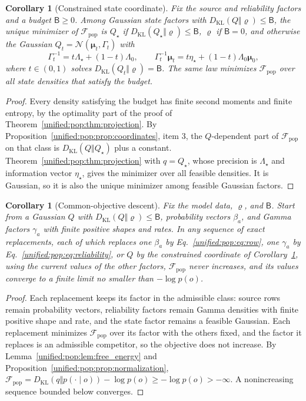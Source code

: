 \documentclass[11pt]{article}
\newtheorem{corollary}[theorem]{Corollary}
\theoremstyle{definition}
\theoremstyle{remark}
\providecommand{\KL}{D_{\mathrm{KL}}}
\providecommand{\N}{\mathcal{N}}
\providecommand{\F}{\mathcal{F}}
\begin{document}
\begin{corollary}[Constrained state coordinate]
\label{unified:pop:cor:constrained}
Fix the source and reliability factors and a budget $\mathsf B\ge0$. Among Gaussian state factors with $\KL(Q\Vert\varrho)\le\mathsf B$, the unique minimizer of $\F_{\mathrm{pop}}$ is $Q_\star$ if $\KL(Q_\star\Vert\varrho)\le\mathsf B$, $\varrho$ if $\mathsf B=0$, and otherwise the Gaussian $Q_t=\N(\boldsymbol\mu_t,\Gamma_t)$ with
\begin{equation}
\Gamma_t^{-1}=t\Lambda_\star+(1-t)\Lambda_0,\qquad \Gamma_t^{-1}\boldsymbol\mu_t=t\eta_\star+(1-t)\Lambda_0\boldsymbol\mu_0,
\label{unified:pop:eq:constrained}
\end{equation}
where $t\in(0,1)$ solves $\KL(Q_t\Vert\varrho)=\mathsf B$. The same law minimizes $\F_{\mathrm{pop}}$ over all state densities that satisfy the budget.
\end{corollary}

\begin{proof}
Every density satisfying the budget has finite second moments and finite entropy, by the optimality part of the proof of Theorem~\ref{unified:pop:thm:projection}. By Proposition~\ref{unified:pop:prop:coordinates}, item 3, the $Q$-dependent part of $\F_{\mathrm{pop}}$ on that class is $\KL(Q\Vert Q_\star)$ plus a constant. Theorem~\ref{unified:pop:thm:projection} with $q=Q_\star$, whose precision is $\Lambda_\star$ and information vector $\eta_\star$, gives the minimizer over all feasible densities. It is Gaussian, so it is also the unique minimizer among feasible Gaussian factors.
\end{proof}

\begin{corollary}[Common-objective descent]
\label{unified:pop:cor:descent}
Fix the model data, $\varrho$, and $\mathsf B$. Start from a Gaussian $Q$ with $\KL(Q\Vert\varrho)\le\mathsf B$, probability vectors $\beta_a$, and Gamma factors $\gamma_a$ with finite positive shapes and rates. In any sequence of exact replacements, each of which replaces one $\beta_a$ by Eq.~\eqref{unified:pop:eq:row}, one $\gamma_a$ by Eq.~\eqref{unified:pop:eq:reliability}, or $Q$ by the constrained coordinate of Corollary~\ref{unified:pop:cor:constrained}, using the current values of the other factors, $\F_{\mathrm{pop}}$ never increases, and its values converge to a finite limit no smaller than $-\log p(o)$.
\end{corollary}

\begin{proof}
Each replacement keeps its factor in the admissible class: source rows remain probability vectors, reliability factors remain Gamma densities with finite positive shape and rate, and the state factor remains a feasible Gaussian. Each replacement minimizes $\F_{\mathrm{pop}}$ over its factor with the others fixed, and the factor it replaces is an admissible competitor, so the objective does not increase. By Lemma~\ref{unified:pop:lem:free_energy} and Proposition~\ref{unified:pop:prop:normalization}, $\F_{\mathrm{pop}}=\KL(q\Vert p(\cdot\mid o))-\log p(o)\ge-\log p(o)>-\infty$. A nonincreasing sequence bounded below converges.
\end{proof}
\end{document}
